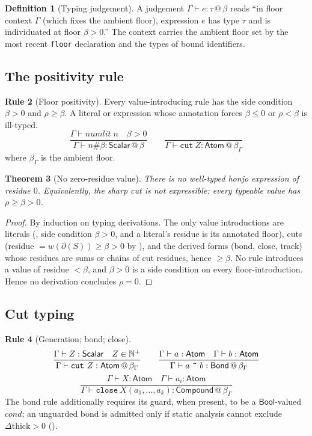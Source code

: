\documentclass[11pt,a4paper]{article}
\theoremstyle{thmstyle}
\newtheorem{theorem}{Theorem}[section]
\theoremstyle{definition}
\newtheorem{definition}[theorem]{Definition}
\newtheorem{rulename}[theorem]{Rule}
\theoremstyle{remark}
\newcommand{\N}{\mathbb{N}}
\newcommand{\flo}{\beta}
\newcommand{\res}{\rho}
\newcommand{\cut}{\partial}
\newcommand{\hj}[1]{\texttt{#1}}
\begin{document}
\begin{definition}[Typing judgement]
\label{def:judgement}
A judgement $\Gamma\vdash e : \tau \,@\, \flo$ reads ``in floor context
$\Gamma$ (which fixes the ambient floor), expression $e$ has type $\tau$
and is individuated at floor $\flo>0$.'' The context carries the ambient
floor set by the most recent \hj{floor} declaration and the types of
bound identifiers.
\end{definition}

\subsection{The positivity rule}

\begin{rulename}[Floor positivity]
\label{rule:positive}
Every value-introducing rule has the side condition $\flo>0$ and
$\res\ge\flo$. A literal or expression whose annotation forces
$\flo\le0$ or $\res<\flo$ is ill-typed.
\[
\frac{\Gamma\vdash \textit{numlit}\;n \quad \flo>0}
     {\Gamma\vdash n\#\flo : \mathsf{Scalar}\,@\,\flo}
\qquad
\frac{}{\Gamma\vdash \hj{cut}\ Z : \mathsf{Atom}\,@\,\flo_\Gamma}
\]
where $\flo_\Gamma$ is the ambient floor.
\end{rulename}

\begin{theorem}[No zero-residue value]
\label{thm:no-zero-value}
There is no well-typed honjo expression of residue $0$. Equivalently, the
sharp cut is not expressible: every typeable value has $\res\ge\flo>0$.
\end{theorem}

\begin{proof}
By induction on typing derivations. The only value introductions are
literals (, side condition $\flo>0$, and a literal's
residue is its annotated floor), cuts (residue $=w(\cut(S))\ge\flo>0$ by
), and the derived forms (bond, close, track) whose residues
are sums or chains of cut residues, hence $\ge\flo$. No rule introduces a
value of residue $<\flo$, and $\flo>0$ is a side condition on every
floor-introduction. Hence no derivation concludes $\res=0$.
\end{proof}

\subsection{Cut typing}

\begin{rulename}[Generation; bond; close]
\label{rule:verbs}
\[
\frac{\Gamma\vdash Z:\mathsf{Scalar}\quad Z\in\N^{+}}
     {\Gamma\vdash \hj{cut}\ Z : \mathsf{Atom}\,@\,\flo_\Gamma}
\qquad
\frac{\Gamma\vdash a:\mathsf{Atom}\quad \Gamma\vdash b:\mathsf{Atom}}
     {\Gamma\vdash a\ \hj{\~{}}\ b : \mathsf{Bond}\,@\,\flo_\Gamma}
\]
\[
\frac{\Gamma\vdash X:\mathsf{Atom}\quad
      \Gamma\vdash a_i:\mathsf{Atom}}
     {\Gamma\vdash \hj{close}\ X(a_1,\dots,a_k) : \mathsf{Compound}\,@\,\flo_\Gamma}
\]
The bond rule additionally requires its guard, when present, to be a
$\mathsf{Bool}$-valued $\textit{cond}$; an unguarded bond is admitted only
if static analysis cannot exclude $\Delta\mathrm{thick}>0$
().
\end{rulename}
\end{document}
